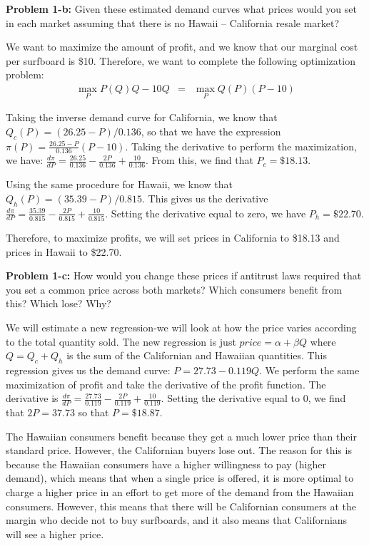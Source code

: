 \documentclass[psamsfonts]{amsart}
\newenvironment{sol}{\vspace{0.25cm}{\large \bfseries Solution:}}{\qedsymbol}
\newenvironment{prob}[1]{\begin{framed}{\large \bfseries Problem #1:}}{\end{framed}}
\begin{document}
\begin{prob}{1-b}
Given these estimated demand curves what prices would you set in each market assuming that there is no Hawaii – California resale market? 
\end{prob}
\begin{sol}
We want to maximize the amount of profit, and we know that our marginal cost per surfboard is \$10. Therefore, we want to complete the following optimization problem:
\begin{eqnarray}
\max_{P} P(Q) Q - 10Q &=& \max_{P} Q(P) (P - 10)
\end{eqnarray}

Taking the inverse demand curve for California, we know that $Q_c(P) = (26.25 - P)/0.136$, so that we have the expression $\pi(P) = \frac{26.25-P}{0.136} \left(P-10 \right)$. Taking the derivative to perform the maximization, we have: $\frac{d \pi}{ dP} = \frac{26.25}{0.136} - \frac{2P}{0.136} + \frac{10}{0.136}$. From this, we find that $P_c = \$18.13$. 

Using the same procedure for Hawaii, we know that $Q_h(P) = (35.39 - P)/0.815$. This gives us the derivative $\frac{d \pi}{dP} = \frac{35.39}{0.815} - \frac{2P}{0.815} + \frac{10}{0.815}$. Setting the derivative equal to zero, we have $P_h = \$22.70$. 

Therefore, to maximize profits, we will set prices in California to \$18.13 and prices in Hawaii to \$22.70. 
\end{sol}

\begin{prob}{1-c}
How would you change these prices if antitrust laws required that you set a common price across both markets? Which consumers benefit from this? Which lose? Why?
\end{prob}
\begin{sol}
We will estimate a new regression-we will look at how the price varies according to the total quantity sold. The new regression is just $price = \alpha + \beta Q$ where $Q = Q_c + Q_h$ is the sum of the Californian and Hawaiian quantities. This regression gives us the demand curve: $P = 27.73 - 0.119Q$. We perform the same maximization of profit and take the derivative of the profit function. The derivative is $\frac{d \pi}{d P} = \frac{27.73}{0.119} - \frac{2P}{0.119} + \frac{10}{0.119}$. Setting the derivative equal to 0, we find that $2P = 37.73 $ so that $P = \$18.87$. 

The Hawaiian consumers benefit because they get a much lower price than their standard price. However, the Californian buyers lose out. The reason for this is because the Hawaiian consumers have a higher willingness to pay (higher demand), which means that when a single price is offered, it is more optimal to charge a higher price in an effort to get more of the demand from the Hawaiian consumers. However, this means that there will be Californian consumers at the margin who decide not to buy surfboards, and it also means that Californians will see a higher price. 
\end{sol}
\end{document}
